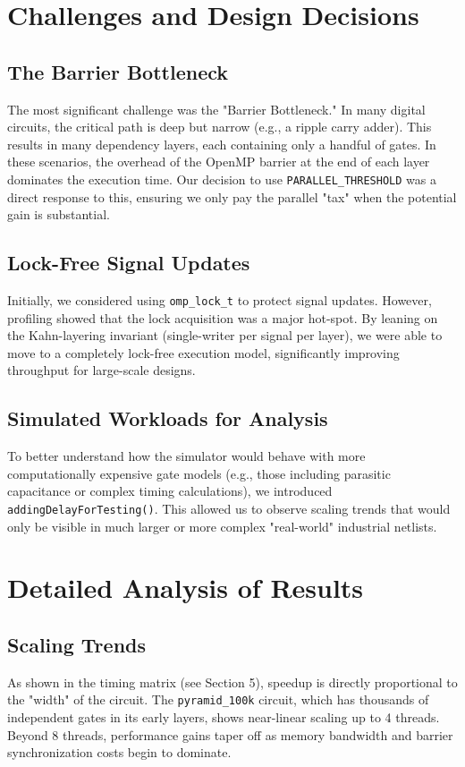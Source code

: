 \documentclass[9pt,a4paper]{article}
\begin{document}
\section{Challenges and Design Decisions}

\subsection{The Barrier Bottleneck}
The most significant challenge was the "Barrier Bottleneck." In many digital circuits, the critical path is deep but narrow (e.g., a ripple carry adder). This results in many dependency layers, each containing only a handful of gates. In these scenarios, the overhead of the OpenMP barrier at the end of each layer dominates the execution time. Our decision to use \texttt{PARALLEL\_THRESHOLD} was a direct response to this, ensuring we only pay the parallel "tax" when the potential gain is substantial.

\subsection{Lock-Free Signal Updates}
Initially, we considered using \texttt{omp\_lock\_t} to protect signal updates. However, profiling showed that the lock acquisition was a major hot-spot. By leaning on the Kahn-layering invariant (single-writer per signal per layer), we were able to move to a completely lock-free execution model, significantly improving throughput for large-scale designs.

\subsection{Simulated Workloads for Analysis}
To better understand how the simulator would behave with more computationally expensive gate models (e.g., those including parasitic capacitance or complex timing calculations), we introduced \texttt{addingDelayForTesting()}. This allowed us to observe scaling trends that would only be visible in much larger or more complex "real-world" industrial netlists.

\section{Detailed Analysis of Results}

\subsection{Scaling Trends}
As shown in the timing matrix (see Section 5), speedup is directly proportional to the "width" of the circuit. The \texttt{pyramid\_100k} circuit, which has thousands of independent gates in its early layers, shows near-linear scaling up to 4 threads. Beyond 8 threads, performance gains taper off as memory bandwidth and barrier synchronization costs begin to dominate.
\end{document}
